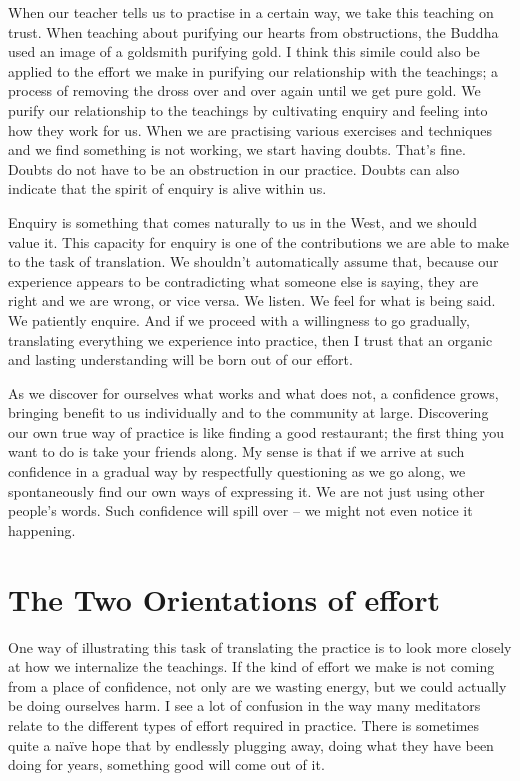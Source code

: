 When our teacher tells us to practise in a certain way, we take this teaching on trust. When teaching about purifying our hearts from obstructions, the Buddha used an image of a goldsmith purifying gold. I think this simile could also be applied to the effort we make in purifying our relationship with the teachings; a process of removing the dross over and over again until we get pure gold. We purify our relationship to the teachings by cultivating enquiry and feeling into how they work for us. When we are practising various exercises and techniques and we find something is not working, we start having doubts. That's fine. Doubts do not have to be an obstruction in our practice. Doubts can also indicate that the spirit of enquiry is alive within us.

Enquiry is something that comes naturally to us in the West, and we
should value it. This capacity for enquiry is one of the contributions
we are able to make to the task of translation. We shouldn't
automatically assume that, because our experience appears to be
contradicting what someone else is saying, they are right and we are
wrong, or vice versa. We listen. We feel for what is being said. We
patiently enquire. And if we proceed with a willingness to go gradually,
translating everything we experience into practice, then I trust that an
organic and lasting understanding will be born out of our effort.

As we discover for ourselves what works and what does not, a confidence
grows, bringing benefit to us individually and to the community at
large. Discovering our own true way of practice is like finding a good
restaurant; the first thing you want to do is take your friends along.
My sense is that if we arrive at such confidence in a gradual way by
respectfully questioning as we go along, we spontaneously find our own
ways of expressing it. We are not just using other people's words. Such
confidence will spill over -- we might not even notice it happening.

\section{The Two Orientations of effort}

One way of illustrating this task of translating the practice is to look
more closely at how we internalize the teachings. If the kind of effort
we make is not coming from a place of confidence, not only are we
wasting energy, but we could actually be doing ourselves harm. I see a
lot of confusion in the way many meditators relate to the different
types of effort required in practice. There is sometimes quite a naïve
hope that by endlessly plugging away, doing what they have been doing
for years, something good will come out of it.

